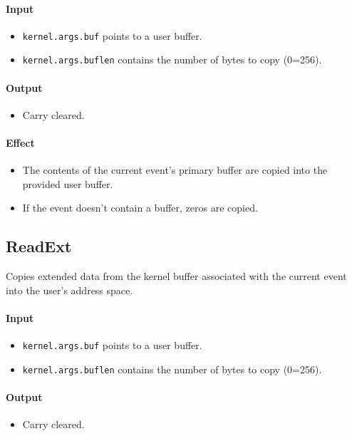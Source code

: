 \paragraph{Input}
\begin{itemize}
\item \verb+kernel.args.buf+ points to a user buffer.
\item \verb+kernel.args.buflen+ contains the number of bytes to copy (0=256).
\end{itemize}

\paragraph{Output}
\begin{itemize}
\item Carry cleared.
\end{itemize}

\paragraph{Effect}
\begin{itemize}
\item The contents of the current event's primary buffer are copied into the provided user buffer.
\item If the event doesn't contain a buffer, zeros are copied.
\end{itemize}

\subsection*{ReadExt}
Copies extended data from the kernel buffer associated with the current event into the user's address space.

\paragraph{Input}
\begin{itemize} 
\item \verb+kernel.args.buf+ points to a user buffer.
\item \verb+kernel.args.buflen+ contains the number of bytes to copy (0=256).
\end{itemize}

\paragraph{Output}
\begin{itemize}
\item Carry cleared.
\end{itemize}


